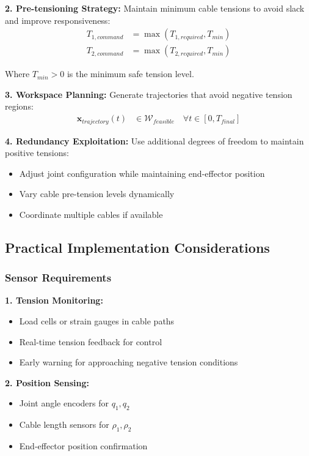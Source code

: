 \textbf{2. Pre-tensioning Strategy:}
Maintain minimum cable tensions to avoid slack and improve responsiveness:
\begin{align}
T_{1,command} &= \max(T_{1,required}, T_{min}) \\
T_{2,command} &= \max(T_{2,required}, T_{min})
\end{align}

Where $T_{min} > 0$ is the minimum safe tension level.

\textbf{3. Workspace Planning:}
Generate trajectories that avoid negative tension regions:
\begin{align}
\bm{x}_{trajectory}(t) &\in \mathcal{W}_{feasible} \quad \forall t \in [0, T_{final}]
\end{align}

\textbf{4. Redundancy Exploitation:}
Use additional degrees of freedom to maintain positive tensions:
\begin{itemize}
    \item Adjust joint configuration while maintaining end-effector position
    \item Vary cable pre-tension levels dynamically
    \item Coordinate multiple cables if available
\end{itemize}

\subsection{Practical Implementation Considerations}

\subsubsection{Sensor Requirements}
\textbf{1. Tension Monitoring:}
\begin{itemize}
    \item Load cells or strain gauges in cable paths
    \item Real-time tension feedback for control
    \item Early warning for approaching negative tension conditions
\end{itemize}

\textbf{2. Position Sensing:}
\begin{itemize}
    \item Joint angle encoders for $q_1, q_2$
    \item Cable length sensors for $\rho_1, \rho_2$
    \item End-effector position confirmation
\end{itemize}


